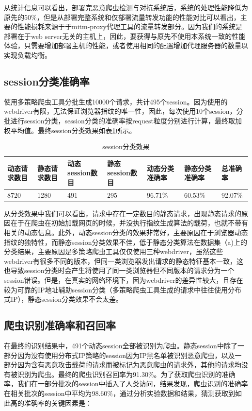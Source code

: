 \documentclass[doctor,privacy,twoside]{buaa_mac}
\begin{document}
从统计信息可以看出，部署完恶意爬虫检测与对抗系统后，系统的处理性能降低为原先的50\%，但是从部署完整系统和仅部署流量转发功能的性能对比可以看出，主要的性能损耗来源于于mitm-proxy代理工具的流量转发部分。因为我们的系统是部署在于web server无关的主机上，因此，要获得与原先不使用本系统一致的性能体验，只需要增加部署主机的性能，或者使用相同的配置增加代理服务器的数量以实现负载均衡。



\subsection{session分类准确率}
使用多策略爬虫工具分批生成10000个请求，共计495个session。因为使用的webdriver有限，无法保证浏览器指纹的唯一性，因此，每次使用10个session，分批进行session分类，session分类的准确率按request粒度分别进行计算，最终取加权平均值。最终session分类效果如表\ref{tab:session-res}所示。

\begin{table}[h]
  \caption{session分类效果}
  \label{tab:session-res}
  \centering
\begin{tabular}{|p{1.5cm}<{\centering}|p{1.5cm}<{\centering}|p{1.5cm}<{\centering}|p{1.5cm}<{\centering}|p{1.5cm}<{\centering}|p{1.5cm}<{\centering}|p{1.5cm}<{\centering}|}
    \hline
  动态请求数目 &  静态请求数目 & 动态session数目 &  静态session数目  & 动态分类准确率  & 静态分类准确率  & 总准确率 \\
    \hline
8720 & 1280 & 491 & 295 & 96.71\% & 60.53\% & 92.07\% \\

\hline
    \end{tabular}
\end{table}
\centerline{}


从分类效果中我们可以看出，请求中存在一定数目的静态请求，出现静态请求的原因在于在爬虫在初始加载网页的时候，并没执行指纹生成算法的载荷，也就不带有相关的动态信息。此外，动态session分类的效果非常好，主要原因在于浏览器动态指纹的独特性，而静态session分类效果不佳，低于静态分类算法在数据集（a)上的分类结果，主要原因是多策略爬虫工具仅仅使用三种webdriver，虽然这些webdriver有很多不同的版本，但同一类浏览器发出请求的静态特征基本一致，这也导致session分类时会产生将使用了同一类浏览器但不同版本的请求分为一个session错误。但是，在真实的网络环境下，因为webdriver的差异性较大，且存在较为可靠的IP地址辅助session分类（多策略爬虫工具生成的请求中往往使用分布式IP），静态session分类效果不会太差。


\subsection{爬虫识别准确率和召回率}
在最终的识别结果中，491个动态session全部被识别为爬虫。静态session中除了一部分因为没有使用分布式IP策略的session因为IP黑名单被识别恶意爬虫，以及一部分因为含有恶意攻击载荷的请求而被标记为恶意爬虫的请求外，其他的请求均没有被识别为爬虫。最终的爬虫识别召回率为91.30\%。为了获取爬虫识别的准确率，我们在一部分批次的session中插入了人类访问，结果发现，爬虫识别的准确率在相关批次的session中平均为98.60\%，通过分析实验数据和结果，猜测获取到如此高的准确率的关键因素是：
\end{document}
